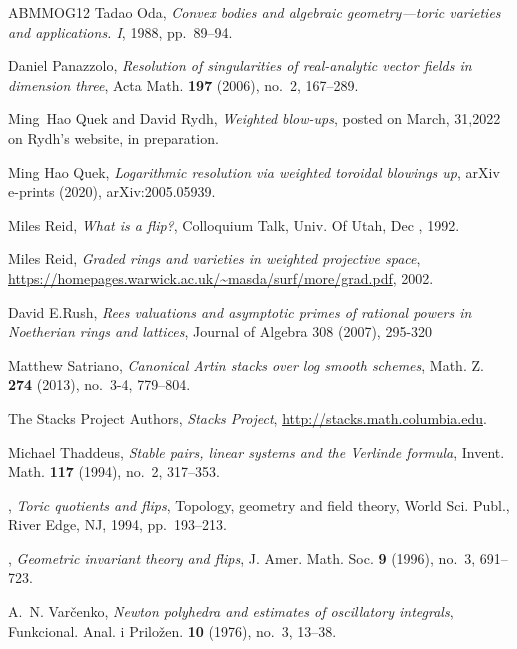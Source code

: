\documentclass{amsart}
\begin{document}
\begin{thebibliography}{ABMMOG12}
Tadao Oda, \emph{Convex bodies and algebraic geometry---toric varieties and
  applications. {I}}, 1988, pp.~89--94. 

Daniel Panazzolo, \emph{Resolution of singularities of real-analytic vector
  fields in dimension three}, Acta Math. \textbf{197} (2006), no.~2, 167--289.

Ming~Hao Quek and David Rydh, \emph{{Weighted blow-ups}}, posted on March, 31,2022 on Rydh's website, in preparation.

Ming Hao Quek, \emph{{Logarithmic resolution via weighted toroidal blowings
  up}}, arXiv e-prints (2020), arXiv:2005.05939.

Miles Reid, \emph{What is a flip?}, Colloquium Talk, Univ. Of Utah, Dec , 1992.

Miles Reid, \emph{Graded rings and varieties in weighted projective space},
  \url{https://homepages.warwick.ac.uk/~masda/surf/more/grad.pdf}, 2002.

 David E.Rush, \emph{Rees valuations and asymptotic primes of rational powers in Noetherian rings and lattices}, Journal of Algebra 308 (2007), 295-320

Matthew Satriano, \emph{Canonical {A}rtin stacks over log smooth schemes},
  Math. Z. \textbf{274} (2013), no.~3-4, 779--804. 
  
The {Stacks Project Authors}, \emph{{\itshape Stacks Project}},
  \url{http://stacks.math.columbia.edu}.



Michael Thaddeus, \emph{Stable pairs, linear systems and the {V}erlinde
  formula}, Invent. Math. \textbf{117} (1994), no.~2, 317--353. 

\bysame, \emph{Toric quotients and flips}, Topology, geometry and field theory,
  World Sci. Publ., River Edge, NJ, 1994, pp.~193--213. 

\bysame, \emph{Geometric invariant theory and flips}, J. Amer. Math. Soc.
  \textbf{9} (1996), no.~3, 691--723. 

A.~N. Var\v{c}enko, \emph{Newton polyhedra and estimates of oscillatory
  integrals}, Funkcional. Anal. i Prilo\v{z}en. \textbf{10} (1976), no.~3,
  13--38. 


\end{thebibliography}
\end{document}
